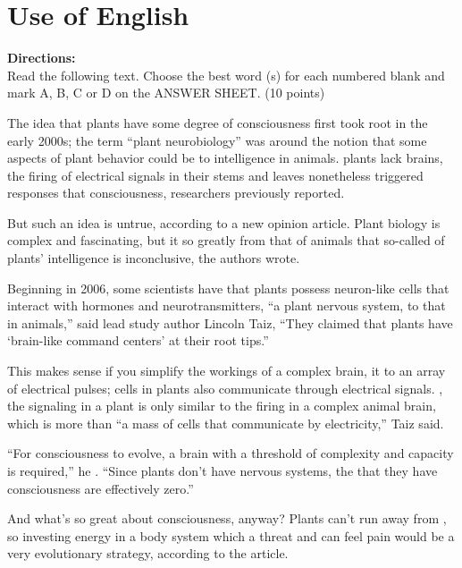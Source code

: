 

\section{Use of English}

\noindent
\textbf{Directions:}\\
Read the following text. Choose the best word (s) for each numbered blank
and mark A, B, C or D on the
ANSWER SHEET. (10 points)

\TiGanSpace


The idea that plants have some degree of consciousness first took root
in the early 2000s; the term ``plant
neurobiology'' was  \cloze around the notion that some aspects of plant behavior could be
\cloze 
to intelligence in
animals.
 \cloze 
plants lack brains, the firing of electrical signals in their stems and
leaves nonetheless triggered
responses that  \cloze 
consciousness, researchers previously reported.


But such an idea is untrue, according to a new opinion article. Plant
biology is complex and fascinating, but it
 \cloze 
so greatly from that of animals that so-called
 \cloze 
 of plants' intelligence is inconclusive, the authors wrote.
 
 
Beginning in 2006, some scientists have
 \cloze 
 that plants possess neuron-like cells that interact with
hormones and neurotransmitters,
 \cloze 
``a plant nervous system,  \cloze 
to that in animals,'' said lead study author 
Lincoln Taiz, ``They  \cloze claimed that plants have `brain-like command centers' at their root
tips.''



This
 \cloze 
makes sense if you simplify the workings of a complex brain,
 \cloze 
it to an array of electrical pulses; cells in plants also communicate through electrical signals.
 \cloze , the signaling in a plant is only
 \cloze 
similar to the firing in a complex animal brain, which is more than ``a
mass of cells that communicate by
electricity,'' Taiz said.



``For consciousness to evolve, a brain with a threshold
 \cloze 
of complexity and capacity is required,'' he 
  \cloze . ``Since plants don't have nervous systems, the
 \cloze 
that they have consciousness are effectively zero.''


And what's so great about consciousness, anyway? Plants can't run away
from
 \cloze , so investing energy in
a body system which
 \cloze 
a threat and can feel pain would be a very
 \cloze 
evolutionary strategy, according to
the article.

